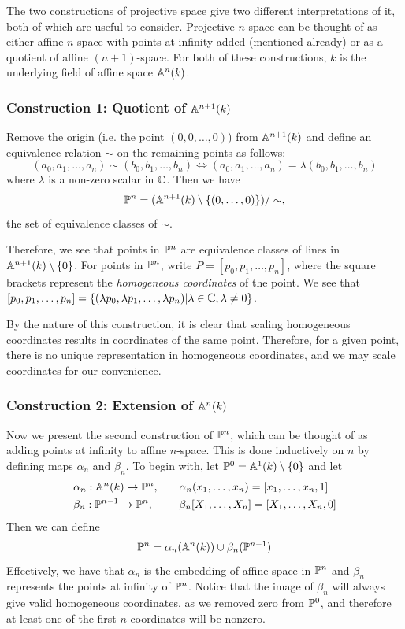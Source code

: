 The two constructions of projective space give two different interpretations of it, both of which are useful to consider.
Projective $n$-space can be thought of as either affine $n$-space with points at infinity added (mentioned already) or as a quotient of affine $(n+1)$-space.
For both of these constructions, $k$ is the underlying field of affine space $\an(k)$.

\subsubsection{Construction 1: Quotient of $\an[n+1](k)$}
Remove the origin (i.e. the point $(0,0,\ldots,0)$) from $\an[n+1](k)$ and define an equivalence relation $\sim$ on the remaining points as follows:
$$(a_0,a_1,\ldots,a_n) \sim (b_0,b_1,\ldots,b_n) \iff (a_0,a_1,\ldots,a_n) = \lambda(b_0,b_1,\ldots,b_n)$$
where $\lambda$ is a non-zero scalar in $\C$.
Then we have 
$$\pn = (\an[n+1](k)\setminus\{(0,\ldots,0)\})/\sim,$$
the set of equivalence classes of $\sim$.

Therefore, we see that points in $\pn$ are equivalence classes of lines in $\an[n+1](k) \setminus \{0\}$.
For points in $\pn$, write $P = [p_0,p_1,\ldots,p_n]$, where the square brackets represent the \emph{homogeneous coordinates} of the point.
We see that $[p_0,p_1,\ldots,p_n] = \{(\lambda p_0, \lambda p_1,\ldots,\lambda p_n) | \lambda \in \C, \lambda\neq0\}$.

By the nature of this construction, it is clear that scaling homogeneous coordinates results in coordinates of the same point.
Therefore, for a given point, there is no unique representation in homogeneous coordinates, and we may scale coordinates for our convenience.

\subsubsection{Construction 2: Extension of $\an[n](k)$}
Now we present the second construction of $\pn$, which can be thought of as adding points at infinity to affine $n$-space.
This is done inductively on $n$ by defining maps $\alpha_n$ and $\beta_n$.
To begin with, let $\pn[0] = \an[1](k) \setminus \{0\}$ and let
\begin{alignat*}{2}
	&\alpha_n : \an(k) \rightarrow \pn,\quad &&\alpha_n(x_1,\ldots,x_n) = [x_1,\ldots,x_n,1]\\
 &\beta_n : \pn[n-1] \rightarrow \pn,\quad &&\beta_n[X_1,\ldots,X_n] = [X_1,\ldots,X_n,0]
\end{alignat*}
Then we can define
$$\pn = \alpha_n(\an(k)) \cup \beta_n(\pn[n-1])$$
Effectively, we have that $\alpha_n$ is the embedding of affine space in $\pn$ and $\beta_n$ represents the points at infinity of $\pn$.
Notice that the image of $\beta_n$ will always give valid homogeneous coordinates, as we removed zero from $\pn[0]$, and therefore at least one of the first $n$ coordinates will be nonzero.
